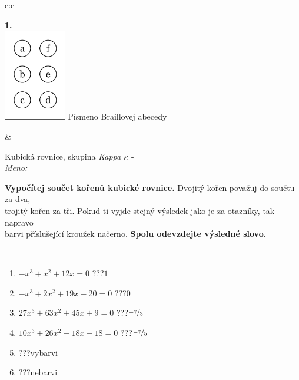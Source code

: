 \documentclass[10pt]{report}
\begin{document}
\begin{tabular}{c:c}
\begin{minipage}[c][104.5mm][t]{0.5\linewidth}
\begin{center}
\begin{minipage}{0.20\linewidth}
\begin{center}
{\Huge\bfseries 1.} \\[2mm]
\includegraphics[height=40mm]{../images/braille.png}
{\small Písmeno Braillovej abecedy}
\end{center}
\end{minipage}
\end{center}
\end{minipage}
&
\begin{minipage}[c][104.5mm][t]{0.5\linewidth}
\begin{center}
\vspace{7mm}
{\huge Kubická rovnice, skupina \textit{Kappa $\kappa$} -}\\[5mm]
\textit{Meno:}\phantom{xxxxxxxxxxxxxxxxxxxxxxxxxxxxxxxxxxxxxxxxxxxxxxxxxxxxxxxxxxxxxxxxx}\\[5mm]
\begin{minipage}{0.95\linewidth}
\textbf{Vypočítej součet kořenů kubické rovnice.} Dvojitý kořen považuj do součtu za dva,\\trojitý kořen za tři. Pokud ti vyjde stejný výsledek jako je za otazníky, tak napravo\\barvi příslušející kroužek načerno. \textbf{Spolu odevzdejte výsledné slovo}.
\end{minipage}
\\[1mm]
\begin{minipage}{0.79\linewidth}
\begin{center}
\begin{varwidth}{\linewidth}
\begin{enumerate}
\Large
\item $-x^3+x^2+12x=0$\quad \dotfill\; ???\;\dotfill \quad $1$
\item $-x^3+2x^2+19x-20=0$\quad \dotfill\; ???\;\dotfill \quad $0$
\item $27x^3+63x^2+45x+9=0$\quad \dotfill\; ???\;\dotfill \quad $\nicefrac{-7}{3}$
\item $10x^3+26x^2-18x-18=0$\quad \dotfill\; ???\;\dotfill \quad $\nicefrac{-7}{5}$
\item \quad \dotfill\; ???\;\dotfill \quad vybarvi
\item \quad \dotfill\; ???\;\dotfill \quad nebarvi

\end{enumerate}
\end{varwidth}
\end{center}
\end{minipage}
\end{center}
\end{minipage}
\end{tabular}
\end{document}
